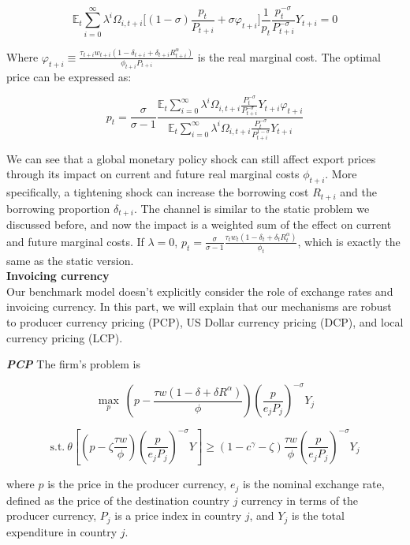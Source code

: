\begin{equation}
\mathbb{E}_t \sum_{i=0}^{\infty} \lambda^i \Omega_{i,t+i} \biggr[(1-\sigma)\frac{p_t}{P_{t+i}}+\sigma \varphi_{t+i}\biggr]\frac{1}{p_t}\frac{p_t^{-\sigma}}{P_{t+i}^{-\sigma}}Y_{t+i}=0
\end{equation}

Where $\varphi_{t+i}\equiv \frac{\tau_{t+i} w_{t+i}(1-\delta_{t+i}+\delta_{t+i} R_{t+i}^\alpha)}{\phi_{t+i}P_{t+i}}$ is the real marginal cost. The optimal price can be expressed as:

\begin{equation}
p_t=\frac{\sigma}{\sigma-1}\frac{\mathbb{E}_t \sum_{i=0}^{\infty} \lambda^i \Omega_{i,t+i}\frac{P_t^{-\sigma}}{P_{t+i}^{-\sigma}}Y_{t+i}\varphi_{t+i}}{\mathbb{E}_t \sum_{i=0}^{\infty} \lambda^i \Omega_{i,t+i}\frac{P_t^{-\sigma}}{P_{t+i}^{1-\sigma}}Y_{t+i}}
\end{equation}

We can see that a global monetary policy shock can still affect export prices through its impact on current and future real marginal costs $\phi_{t+i}$. More specifically, a tightening shock can increase the borrowing cost $R_{t+i}$ and the borrowing proportion $\delta_{t+i}$. The channel is similar to the static problem we discussed before, and now the impact is a weighted sum of the effect on current and future marginal costs. If $\lambda=0$, $p_t=\frac{\sigma}{\sigma-1}\frac{\tau_{t} w_{t}(1-\delta_{t}+\delta_{t} R_{t}^\alpha)}{\phi_{t}}$, which is exactly the same as the static version. \\


\textbf{Invoicing currency} \\

Our benchmark model doesn't explicitly consider the role of exchange rates and invoicing currency. In this part, we will explain that our mechanisms are robust to producer currency pricing (PCP), US Dollar currency pricing (DCP), and local currency pricing (LCP). 

\textbf{\textit{PCP}} The firm's problem is 

$$
\max_{p} \ (p- \frac{\tau w(1-\delta+\delta R^\alpha)}{\phi}) (\frac{p}{e_jP_j})^{-\sigma} Y_j
$$

$$
\text{s.t.} \ \theta [(p-\zeta \frac{\tau w}{\phi}) (\frac{p}{e_jP_j})^{-\sigma} Y]\geq(1-c^\gamma-\zeta)\frac{\tau w}{\phi} (\frac{p}{e_jP_j})^{-\sigma} Y_j
$$

where $p$ is the price in the producer currency, $e_j$ is the nominal exchange rate, defined as the price of the destination country $j$ currency in terms of the producer currency, $P_j$ is a price index in country $j$, and $Y_j$ is the total expenditure in country $j$.


